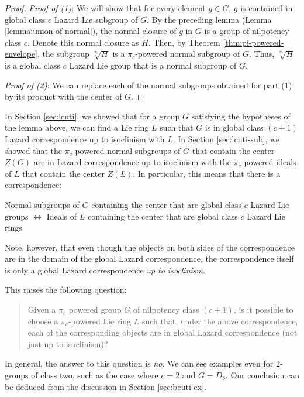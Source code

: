 \begin{proof}
  {\em Proof of (1)}: We will show that for every element $g \in G$,
  $g$ is contained in global class $c$ Lazard Lie subgroup of $G$. By
  the preceding lemma (Lemma \ref{lemma:union-of-normal}), the normal
  closure of $g$ in $G$ is a group of nilpotency class $c$. Denote
  this normal closure as $H$. Then, by Theorem
  \ref{thm:pi-powered-envelope}, the subgroup $\sqrt[\pi_c]{H}$ is a
  $\pi_c$-powered normal subgroup of $G$. Thus, $\sqrt[\pi_c]{H}$ is a
  global class $c$ Lazard Lie group that is a normal subgroup of $G$.

  {\em Proof of (2)}: We can replace each of the normal subgroups
  obtained for part (1) by its product with the center of $G$.
\end{proof} 

In Section \ref{sec:lcuti}, we showed that for a group $G$ satisfying
the hypotheses of the lemma above, we can find a Lie ring $L$ such
that $G$ is in global class $(c + 1)$ Lazard correspondence up to
isoclinism with $L$. In Section \ref{sec:lcuti-sub}, we showed that
the $\pi_c$-powered normal subgroups of $G$ that contain the center
$Z(G)$ are in Lazard correspondence up to isoclinism with the
$\pi_c$-powered ideals of $L$ that contain the center $Z(L)$. In
particular, this means that there is a correspondence:

\begin{center}
  Normal subgroups of $G$ containing the center that are global class
  $c$ Lazard Lie groups $\leftrightarrow$ Ideals of $L$ containing the
  center that are global class $c$ Lazard Lie rings
\end{center}

Note, however, that even though the objects on both sides of the
correspondence are in the domain of the global Lazard correspondence,
the correspondence itself is only a global Lazard correspondence {\em
  up to isoclinism}.

This raises the following question:

\begin{quote}
  Given a $\pi_c$ powered group $G$ of nilpotency class $(c + 1)$, is
  it possible to choose a $\pi_c$-powered Lie ring $L$ such that,
  under the above correspondence, each of the corresponding objects
  are in global Lazard correspondence (not just up to isoclinism)?
\end{quote}

In general, the answer to this question is {\em no}. We can see
examples even for $2$-groups of class two, such as the case where $c =
2$ and $G = D_8$. Our conclusion can be deduced from the discussion in
Section \ref{sec:bcuti-ex}.

